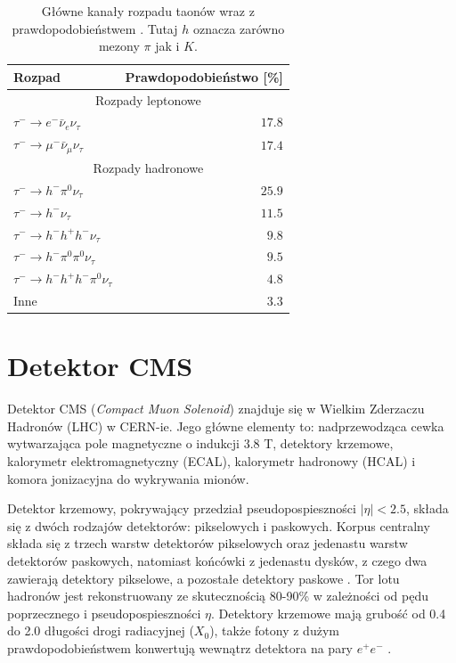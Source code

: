 \documentclass{pracalicmgr}
\begin{document}
	\begin{table}[H]
	\centering
	\caption{Główne kanały rozpadu taonów wraz z prawdopodobieństwem \cite{tauid13, particle_physics}. Tutaj $h$ oznacza zarówno mezony $\pi$ jak i $K$.}
	\label{tab:kanaly_rozpadu}
	\begin{tabular}{lr}
	\toprule
	Rozpad & Prawdopodobieństwo [\%] \\
	\midrule
	\multicolumn{2}{c}{Rozpady leptonowe} \\
	\midrule
	$\tau^- \rightarrow e^-\bar{\nu}_{e}\nu_{\tau}$ & $17.8$ \\
	$\tau^- \rightarrow \mu^-\bar{\nu}_{\mu}\nu_{\tau}$ & $17.4$ \\
	\midrule
	\multicolumn{2}{c}{Rozpady hadronowe} \\
	\midrule
	$\tau^- \rightarrow h^- \pi^0 \nu_{\tau}$ & $25.9$ \\
	$\tau^- \rightarrow h^-\nu_{\tau}$ & $11.5$ \\
	$\tau^- \rightarrow h^- h^+ h^- \nu_{\tau}$ & $9.8$ \\
	$\tau^- \rightarrow h^- \pi^0 \pi^0 \nu_{\tau}$ & $9.5$ \\
	$\tau^- \rightarrow h^- h^+ h^- \pi^0 \nu_{\tau}$ & $4.8$ \\
	Inne & $3.3$ \\	
	\bottomrule
	\end{tabular}
	\end{table}
        
    \section{Detektor CMS}
	Detektor CMS (\textit{Compact Muon Solenoid}) znajduje się w Wielkim Zderzaczu Hadronów (LHC) w CERN-ie. Jego główne elementy to: nadprzewodząca cewka wytwarzająca pole magnetyczne o indukcji 3.8 T, detektory krzemowe, kalorymetr elektromagnetyczny (ECAL), kalorymetr hadronowy (HCAL) i komora jonizacyjna do wykrywania mionów. 
	
	Detektor krzemowy, pokrywający przedział pseudopospieszności $|\eta| < 2.5$, składa się z dwóch rodzajów detektorów: pikselowych i paskowych. Korpus centralny składa się z trzech warstw detektorów pikselowych oraz jedenastu warstw detektorów paskowych, natomiast końcówki z jedenastu dysków, z czego dwa zawierają detektory pikselowe, a pozostałe detektory paskowe \cite{cms_technical}. Tor lotu hadronów jest rekonstruowany ze skutecznością 80-90\% w zależności od pędu poprzecznego i pseudopospieszności $\eta$. Detektory krzemowe mają grubość od 0.4 do 2.0 długości drogi radiacyjnej ($X_0$), także fotony z dużym prawdopodobieństwem konwertują wewnątrz detektora na pary $e^+e^-$ \cite{tauid13}.
	
\end{document}
